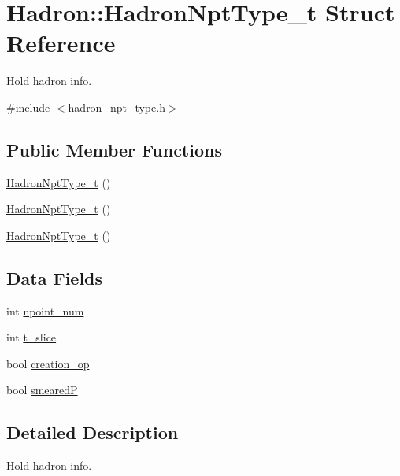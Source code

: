 \hypertarget{structHadron_1_1HadronNptType__t}{}\section{Hadron\+:\+:Hadron\+Npt\+Type\+\_\+t Struct Reference}
\label{structHadron_1_1HadronNptType__t}


Hold hadron info.  




{\ttfamily \#include $<$hadron\+\_\+npt\+\_\+type.\+h$>$}

\subsection*{Public Member Functions}
\begin{DoxyCompactItemize}
\item 
\mbox{\hyperlink{structHadron_1_1HadronNptType__t_aa4d6f71867ef932b64fe7f6a9ba7bc2d}{Hadron\+Npt\+Type\+\_\+t}} ()
\item 
\mbox{\hyperlink{structHadron_1_1HadronNptType__t_aa4d6f71867ef932b64fe7f6a9ba7bc2d}{Hadron\+Npt\+Type\+\_\+t}} ()
\item 
\mbox{\hyperlink{structHadron_1_1HadronNptType__t_aa4d6f71867ef932b64fe7f6a9ba7bc2d}{Hadron\+Npt\+Type\+\_\+t}} ()
\end{DoxyCompactItemize}
\subsection*{Data Fields}
\begin{DoxyCompactItemize}
\item 
int \mbox{\hyperlink{structHadron_1_1HadronNptType__t_a926db91f96db2c9d670df6ebec2ece5b}{npoint\+\_\+num}}
\item 
int \mbox{\hyperlink{structHadron_1_1HadronNptType__t_a9525dc3ea9b4e2a1ec8f9ca1c1eb275c}{t\+\_\+slice}}
\item 
bool \mbox{\hyperlink{structHadron_1_1HadronNptType__t_a65d081620d4746364ee92979f1c663e6}{creation\+\_\+op}}
\item 
bool \mbox{\hyperlink{structHadron_1_1HadronNptType__t_ae339f43ad2a511982ecb2cf581982af6}{smearedP}}
\end{DoxyCompactItemize}


\subsection{Detailed Description}
Hold hadron info. 

